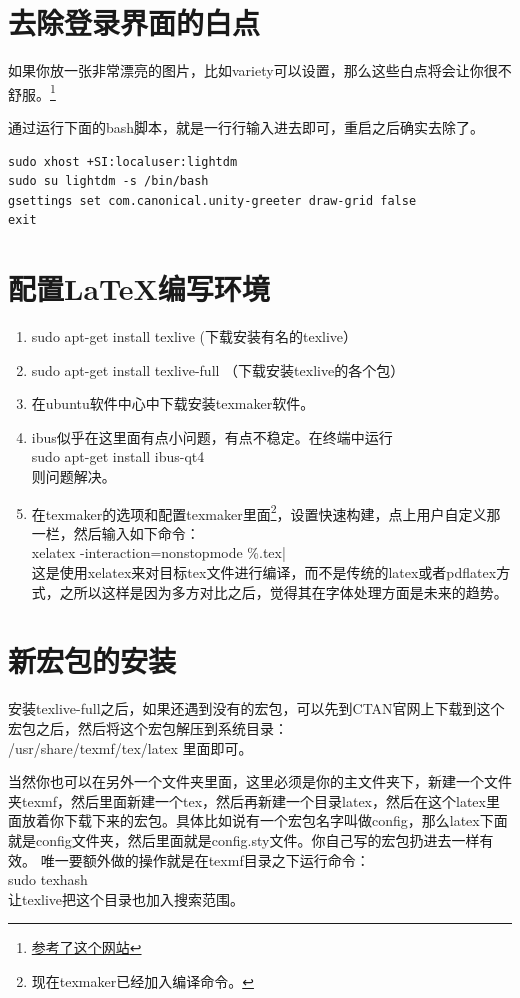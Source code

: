 \documentclass[11pt,oneside]{book}
\begin{document}
\section{去除登录界面的白点}
如果你放一张非常漂亮的图片，比如variety可以设置，那么这些白点将会让你很不舒服。\footnote{\href{http://askubuntu.com/questions/72620/how-do-i-remove-the-dots-from-the-lightdm-greeter}{参考了这个网站}}

通过运行下面的bash脚本，就是一行行输入进去即可，重启之后确实去除了。
\begin{Verbatim}
sudo xhost +SI:localuser:lightdm
sudo su lightdm -s /bin/bash
gsettings set com.canonical.unity-greeter draw-grid false
exit
\end{Verbatim}


\section{配置\LaTeX 编写环境}
\begin{enumerate}
\item sudo apt-get install texlive   (下载安装有名的texlive）
\item sudo apt-get install texlive-full   （下载安装texlive的各个包）
\item 在ubuntu软件中心中下载安装texmaker软件。
\item ibus似乎在这里面有点小问题，有点不稳定。在终端中运行\\sudo apt-get install ibus-qt4\\则问题解决。
\item 在texmaker的选项和配置texmaker里面\footnote{现在texmaker已经加入\XeLaTeX 编译命令。}，设置快速构建，点上用户自定义那一栏，然后输入如下命令：\\
xelatex -interaction=nonstopmode \%.tex| \\
这是使用xelatex来对目标tex文件进行编译，而不是传统的latex或者pdflatex方式，之所以这样是因为多方对比之后，觉得其在字体处理方面是未来的趋势。
\end{enumerate}


\section{新宏包的安装}
安装texlive-full之后，如果还遇到没有的宏包，可以先到CTAN官网上下载到这个宏包之后，然后将这个宏包解压到系统目录：\\
/usr/share/texmf/tex/latex 里面即可。

当然你也可以在另外一个文件夹里面，这里必须是你的主文件夹下，新建一个文件夹texmf，然后里面新建一个tex，然后再新建一个目录latex，然后在这个latex里面放着你下载下来的宏包。具体比如说有一个宏包名字叫做config，那么latex下面就是config文件夹，然后里面就是config.sty文件。你自己写的宏包扔进去一样有效。
唯一要额外做的操作就是在texmf目录之下运行命令：\\
sudo texhash  \\
让texlive把这个目录也加入搜索范围。
\end{document}
